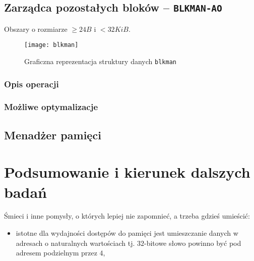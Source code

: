 \documentclass[12pt,a4paper,titlepage,twoside]{mwart}
\begin{document}
\newpage

\subsection{Zarządca pozostałych bloków -- \texttt{BLKMAN-AO}}

Obszary o rozmiarze $\ge 24B$ i $< 32KiB$.

\begin{figure}[h]
\centering
\texttt{[image: blkman]}
\caption{Graficzna reprezentacja struktury danych \texttt{blkman}}
\end{figure}

\subsubsection{Opis operacji}

\subsubsection{Możliwe optymalizacje}

\newpage

\subsection{Menadżer pamięci}

\newpage


\section{Podsumowanie i kierunek dalszych badań}
\hypertarget{Podsumowanie}{}

Śmieci i inne pomysły, o których lepiej nie zapomnieć, a trzeba gdzieś umieścić:
\begin{itemize}
\item istotne dla wydajności dostępów do pamięci jest umieszczanie danych w
adresach o naturalnych wartościach tj. $32$-bitowe słowo powinno być pod
adresem podzielnym przez $4$,
\end{itemize}

\newpage


\nocite{berger00hoard}
\nocite{berger01composing}
\nocite{berger02reconsidering}
\nocite{bonwick94slab}
\nocite{chilimbi00designing}
\nocite{demaine99fast}
\nocite{douglea96malloc}
\nocite{evans06scalable}
\nocite{feng05localityimproving}
\nocite{fitzgibbons00linux}
\nocite{ghemawat07tcmalloc}
\nocite{gorman04linuxvm}
\nocite{iyengar96scalability}
\nocite{johnstone98memory}
\nocite{luby94tight}
\nocite{pas02memory}
\nocite{paul95dynamic}
\nocite{robson71estimate}
\nocite{robson74bounds}
\nocite{robson77worst}
\nocite{stephenson83fastfits}
\nocite{vuillemin80unifying}
\nocite{weinstock88quickfit}



\end{document}
